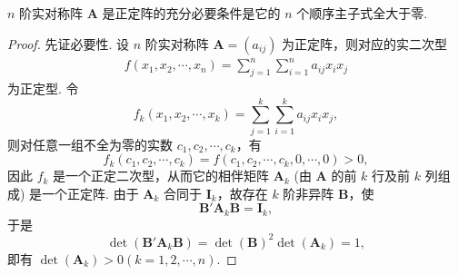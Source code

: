 \documentclass[../../main.tex]{subfiles}%
\begin{document}
\begin{theorem}\label{theorem:实正定阵的充要条件}
$n$ 阶实对称阵 $\boldsymbol{A}$ 是正定阵的充分必要条件是它的 $n$ 个顺序主子式全大于零.
\end{theorem}
\begin{proof}

先证必要性. 设 $n$ 阶实对称阵 $\boldsymbol{A}=(a_{ij})$ 为正定阵，则对应的实二次型
\begin{align*}
f(x_1,x_2,\cdots,x_n)=\sum_{j = 1}^n\sum_{i = 1}^n a_{ij}x_ix_j
\end{align*}
为正定型. 令
\[
f_k(x_1,x_2,\cdots,x_k)=\sum_{j = 1}^k\sum_{i = 1}^k a_{ij}x_ix_j,
\]
则对任意一组不全为零的实数 $c_1,c_2,\cdots,c_k$，有
\[
f_k(c_1,c_2,\cdots,c_k)=f(c_1,c_2,\cdots,c_k,0,\cdots,0)>0,
\]
因此 $f_k$ 是一个正定二次型，从而它的相伴矩阵 $\boldsymbol{A}_k$ (由 $\boldsymbol{A}$ 的前 $k$ 行及前 $k$ 列组成) 是一个正定阵. 由于 $\boldsymbol{A}_k$ 合同于 $\boldsymbol{I}_k$，故存在 $k$ 阶非异阵 $\boldsymbol{B}$，使
\[
\boldsymbol{B}'\boldsymbol{A}_k\boldsymbol{B}=\boldsymbol{I}_k,
\]
于是
\[
\det(\boldsymbol{B}'\boldsymbol{A}_k\boldsymbol{B})=\det(\boldsymbol{B})^2\det(\boldsymbol{A}_k)=1,
\]
即有 $\det(\boldsymbol{A}_k)>0 (k = 1,2,\cdots,n)$.


\end{proof}
\end{document}
